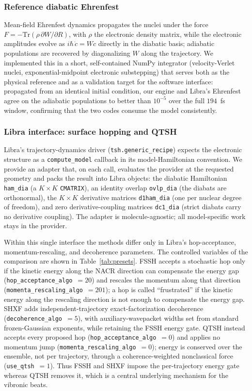 \documentclass[11pt]{article}
\begin{document}
\subsubsection{Reference diabatic Ehrenfest}
Mean-field Ehrenfest dynamics propagates the nuclei under the force $F = -\mathrm{Tr}(\rho\,\partial W/\partial R)$, with $\rho$ the electronic density matrix, while the electronic amplitudes evolve as $i\hbar\,\dot{c} = W c$ directly in the diabatic basis; adiabatic populations are recovered by diagonalizing $W$ along the trajectory. We implemented this in a short, self-contained NumPy integrator (velocity-Verlet nuclei, exponential-midpoint electronic substepping) that serves both as the physical reference and as a validation target for the software interface: propagated from an identical initial condition, our engine and Libra's Ehrenfest agree on the adiabatic populations to better than $10^{-5}$ over the full $194$~fs window, confirming that the two codes consume the model consistently.

\subsubsection{Libra interface: surface hopping and QTSH}
Libra's trajectory-dynamics driver (\texttt{tsh.generic\_recipe}) expects the electronic structure as a \texttt{compute\_model} callback in its model-Hamiltonian convention. We provide an adapter that, on each call, evaluates the provider at the requested geometry and packs the result into Libra objects: the diabatic Hamiltonian \texttt{ham\_dia} (a $K\times K$ \texttt{CMATRIX}), an identity overlap \texttt{ovlp\_dia} (the diabats are orthonormal), the $K\times K$ derivative matrices \texttt{d1ham\_dia} (one per nuclear degree of freedom), and zero derivative-coupling matrices \texttt{dc1\_dia} (strict diabats carry no derivative coupling). The adapter is molecule-agnostic; all model-specific work stays in the provider.

Within this single interface the methods differ only in Libra's hop-acceptance, momentum-rescaling, and decoherence parameters. The controlled variables of the comparison are shown in Table~\ref{tab:presets}. FSSH accepts a stochastic hop only if the kinetic energy along the NACR direction can compensate the energy gap (\texttt{hop\_acceptance\_algo}~$=20$) and rescales the momentum along that direction (\texttt{momenta\_rescaling\_algo}~$=201$); a hop is called ``frustrated'' if the kinetic energy along the rescaling direction is not enough to compensate the energy gap. SHXF adds independent-trajectory exact-factorization decoherence (\texttt{decoherence\_algo}~$=5$), with auxiliary-wavepacket widths set from standard frozen-Gaussian exponents, while retaining the FSSH energy gate. QTSH instead accepts every proposed hop (\texttt{hop\_acceptance\_algo}~$=0$) and applies no momentum jump (\texttt{momenta\_rescaling\_algo}~$=0$); energy is conserved over the ensemble, not per trajectory, through a coherence-weighted nonclassical force (\texttt{use\_qtsh}~$=1$). Thus FSSH and SHXF impose the per-trajectory energy gate whereas QTSH removes it, which is a central underlying mechanism for the vibronic beats.
\end{document}
